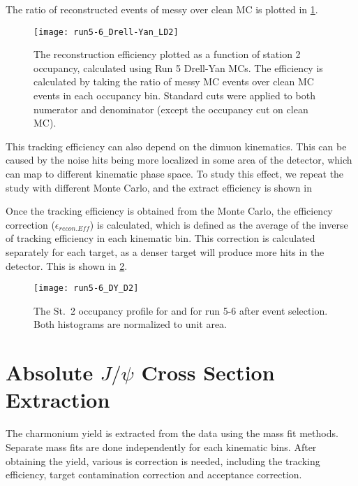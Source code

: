\documentclass[../main.tex]{subfiles}
\begin{document}
The ratio of reconstructed events of messy over clean MC is plotted in \cref{fig:tracking efficiency}.
\begin{figure}[h!]
	\centering
	\texttt{[image: run5-6\_Drell-Yan\_LD2]}
	\caption{The reconstruction efficiency plotted as a function of station 2 occupancy, calculated using
		Run 5  Drell-Yan MCs.
		The efficiency is calculated by taking the ratio of messy MC events over clean MC events in each
		occupancy bin. Standard cuts were applied to both numerator and denominator
		(except the occupancy cut on clean MC).
	}
	\label{fig:tracking efficiency}
\end{figure}

This tracking efficiency can also depend on the dimuon kinematics. This can be caused
by the noise hits being more localized in some area of the detector, which can map to
different kinematic phase space. To study this effect, we repeat the study with different
Monte Carlo, and the extract efficiency is shown in

Once the tracking efficiency is obtained from the Monte Carlo, the efficiency correction ($\epsilon_{recon.Eff}$)
is calculated, which is defined as the average of the inverse of tracking efficiency in each
kinematic bin. This correction is calculated separately for each target, as a denser target
will produce more hits in the detector. This is shown in \cref{fig:target_D2}.

\begin{figure}[h!]
	\centering
	\texttt{[image: run5-6\_DY\_D2]}
	\caption{The St.~2 occupancy profile for  and  for run 5-6 after event selection. Both histograms are normalized to unit area.
	}
	\label{fig:target_D2}
\end{figure}


\section{Absolute \texorpdfstring{$J/\psi$}{J/psi} Cross Section Extraction}
The charmonium yield is extracted from the data using the mass fit methods. 
Separate mass fits are done independently for each kinematic bins. After obtaining 
the yield, various is correction is needed, including the tracking efficiency, target
contamination correction and acceptance correction.
\end{document}
